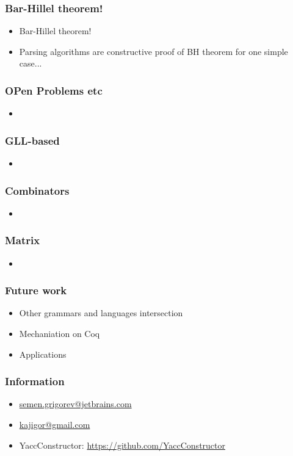\documentclass{beamer}
\begin{document}
\begin{frame}
  \transwipe[direction=90]
  \frametitle{Bar-Hillel theorem!}
  \begin{itemize}
    \item Bar-Hillel theorem!
    \item Parsing algorithms are constructive proof of BH theorem for one simple case...
  \end{itemize}
\end{frame}

\begin{frame}
  \transwipe[direction=90]
  \frametitle{OPen Problems etc}
  \begin{itemize}
    \item 
  \end{itemize}
\end{frame}

\begin{frame}
  \transwipe[direction=90]
  \frametitle{GLL-based}
  \begin{itemize}
    \item 
  \end{itemize}
\end{frame}

\begin{frame}
  \transwipe[direction=90]
  \frametitle{Combinators}
  \begin{itemize}
    \item 
  \end{itemize}
\end{frame}

\begin{frame}
  \transwipe[direction=90]
  \frametitle{Matrix}
  \begin{itemize}
    \item 
  \end{itemize}
\end{frame}

\begin{frame}[fragile]
\transwipe[direction=90]
\frametitle{Future work}
\begin{itemize}
  \item Other grammars and languages intersection
  \item Mechaniation on Coq
  \item Applications 
\end{itemize}
\end{frame}
            
\begin{frame}
\transwipe[direction=90]
\frametitle{Information}
\begin{itemize}
  \item \url{semen.grigorev@jetbrains.com}
  \item \url{kajigor@gmail.com}
  \item YaccConstructor: \url{https://github.com/YaccConstructor}
\end{itemize}
\end{frame}
\end{document}
